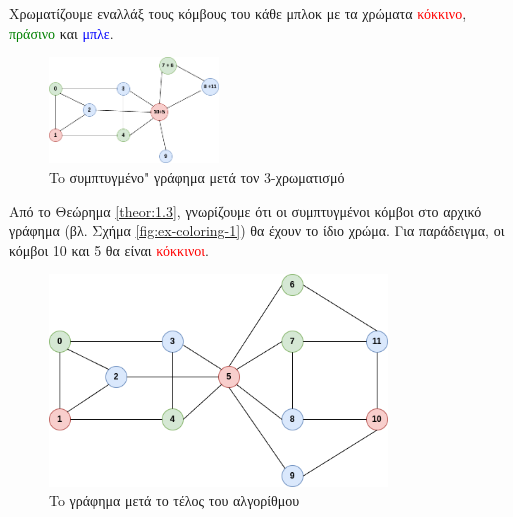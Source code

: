 Χρωματίζουμε εναλλάξ τους κόμβους του κάθε μπλοκ με τα χρώματα \textcolor{red}{κόκκινο}, \textcolor{green}{πράσινο} και \textcolor{blue}{μπλε}. 

\begin{figure}[H]
	\centering
	\includegraphics[width=0.4\textwidth]{pictures/ex-coloring-before-expansion.png} 
	\caption{To συμπτυγμένο" γράφημα μετά τον 3-χρωματισμό}
	\label{fig:ex-coloring-before-expansion}
\end{figure}

Από το Θεώρημα \ref{theor:1.3}, γνωρίζουμε ότι οι συμπτυγμένοι κόμβοι στο αρχικό γράφημα (βλ. Σχήμα \ref{fig:ex-coloring-1}) θα έχουν το ίδιο χρώμα. Για παράδειγμα, οι κόμβοι 10 και 5 θα είναι \textcolor{red}{κόκκινοι}.

\begin{figure}[H]
	\centering
	\includegraphics[width=0.8\textwidth]{pictures/ex-coloring-after-expansion.png} 
	\caption{To γράφημα μετά το τέλος του αλγορίθμου}
	\label{fig:ex-coloring-after-expansion}
\end{figure}














